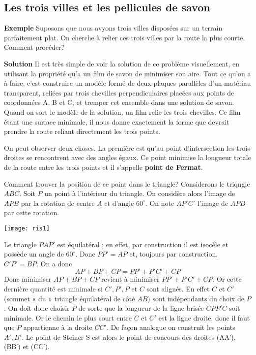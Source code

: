 \documentclass[11pt,a4paper]{report}%
\begin{document}
	
	
		\subsection{Les trois villes et les pellicules de savon}
		\textbf{Exemple} Suposons que nous avyons trois villes disposées sur un terrain parfaitement plat. On cherche à relier ces trois villes par la route la plus courte. Comment procéder?
		
		
		\textbf{Solution}
		Il est très simple de voir la solution de ce problème visuellement, en utilisant la propriété qu'a un film de savon de minimiser son aire. Tout ce qu’on a à faire,
		c’est construire un modèle formé de deux plaques parallèles d’un matériau transparent,
		reliées par trois chevilles perpendiculaires placées aux points de coordonnées A, B et
		C, et tremper cet ensemble dans une solution de savon. Quand on sort le modèle de la
		solution, un film relie les trois chevilles. Ce film  étant une surface minimale, il nous
		donne exactement la forme que devrait prendre la route reliant directement les trois
		points. 
		
		On peut observer deux choses. La première est qu’au point d’intersection les trois droites se rencontrent avec des angles égaux. Ce point minimise la longueur totale de la route entre les trois points et il s'appelle \textbf{point de Fermat}. 
		
		Comment trouver la position de ce point dans le triangle? Considerons le triqngle $ ABC$. Soit $P$ un point à l'intérieur du triangle. On considère alors l'image de $APB$ par la rotation de centre $A$ et d'angle $60^\circ$. On note $AP′C′$ l'image de $APB$ par cette rotation.
		
		
		 \texttt{[image: ris1]}
		 
		 Le triangle $PAP′$ est équilatéral ; en effet, par construction il est isocèle et possède un angle de $60^\circ$. Donc $PP′=AP$ et, toujours par construction, $C′P′=BP$. On a donc
		 \[ AP+BP+CP=PP′+P′C′+CP\]
		 Donc minimiser $AP+BP+CP$ revient à minimiser $PP′+P′C′+CP$. Or cette dernière quantité est minimale si $C′, P′, P$ et $C$ sont alignés. En effet $C$ et $C′$ (sommet « du » triangle équilatéral de côté $AB$) sont indépendants du choix de $P$. On doit donc choisir $P$ de sorte que la longueur de la ligne brisée $CPP′C$ soit minimale. Or le chemin le plus court entre $C$ et $C′$ est la ligne droite, donc il faut que $P$ appartienne à la droite $CC′$. De façon analogue on construit les points $A′, B′$. Le point de Steiner S est alors le point de concours des droites (AA′), (BB′) et (CC′).
\end{document}
